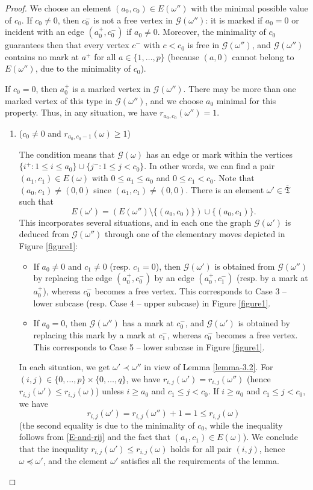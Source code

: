 \documentclass[11pt]{article}
\theoremstyle{definition}
\numberwithin{equation}{section}
\newcommand{\ppermutationsof}{\mathfrak{T}}
\newcommand{\parameters}{\overline{\ppermutationsof}}
\begin{document}
\begin{proof}
We choose an element $(a_0,c_0)\in E(\omega'') $ with the minimal possible value of $c_0$.
If $c_0\not=0$, then $c_0^-$ is not a free vertex in $\mathcal{G}(\omega'')$: it is marked if $a_0=0$ or incident with an edge $(a_0^+,c_0^-)$ if $a_0\not=0$. Moreover, the minimality of $c_0$ guarantees then that every vertex $c^-$ with $c<c_0$ is free in $\mathcal{G}(\omega'')$, and $\mathcal{G}(\omega'')$ contains no mark at $a^+$ for all $a\in\{1,\ldots,p\}$ (because $(a,0)$ cannot belong to $E(\omega'')$, due to the minimality of $c_0$).

If $c_0=0$, then $a_0^+$ is a marked vertex in $\mathcal{G}(\omega'')$.
There may be more than one marked vertex of this type in $\mathcal{G}(\omega'')$, and we choose $a_0$ minimal for this property. Thus, in any situation, we have $r_{a_0,c_0}(\omega'')=1$.

\begin{enumerate}[label=\textbf{Case \arabic*}]
\item ($c_0\not=0$ and $r_{a_0,c_0-1}(\omega)\geq 1$)

\noindent The condition means that $\mathcal{G}(\omega)$ has an edge or mark within the vertices $\{i^+:1\leq i\leq a_0\}\cup\{j^-:1\leq j<c_0\}$.
In other words, we can find a pair $(a_1,c_1)\in E(\omega)$
with $0\leq a_1\leq a_0$ and $0\leq c_1<c_0$.
Note that $(a_0,c_1)\not=(0,0)$ since $(a_1,c_1)\not=(0,0)$.
There is an element
$\omega'\in\parameters$ such that
\[
E(\omega')=(E(\omega'')\setminus\{(a_0,c_0)\})\cup\{(a_0,c_1)\}.
\]
This incorporates several situations, and in each one the graph $\mathcal{G}(\omega')$ is deduced from $\mathcal{G}(\omega'')$ through one of the elementary moves depicted in Figure \ref{figure1}:
\begin{itemize}
\item If $a_0\not=0$ and $c_1\not=0$ (resp. $c_1=0$), then $\mathcal{G}(\omega')$ is obtained from $\mathcal{G}(\omega'')$ by replacing
the edge $(a_0^+,c_0^-)$ by an edge $(a_0^+,c_1^-)$ (resp. by a mark
at $a_0^+$), whereas $c_0^-$ becomes a free vertex. This
corresponds to Case 3 -- lower subcase (resp. Case 4 -- upper
subcase) in Figure \ref{figure1}.
\item If $a_0=0$, then $\mathcal{G}(\omega'')$
has a mark at $c_0^-$, and $\mathcal{G}(\omega')$
is obtained by replacing this mark by a mark at $c_1^-$, whereas $c_0^-$ becomes a free vertex.
This corresponds to Case 5 -- lower subcase in Figure \ref{figure1}.
\end{itemize}
In each situation, we get $\omega'\prec\omega''$ in view of Lemma \ref{lemma-3.2}.
For $(i,j)\in\{0,\ldots,p\}\times\{0,\ldots,q\}$, we have
$r_{i,j}(\omega')=r_{i,j}(\omega'')$ (hence $r_{i,j}(\omega')\leq r_{i,j}(\omega)$) unless $i\geq a_0$ and $c_1\leq j<c_0$.
If $i\geq a_0$ and $c_1\leq j<c_0$, we have
\[r_{i,j}(\omega')=r_{i,j}(\omega'')+1=1\leq r_{i,j}(\omega)\]
(the second equality is due to the minimality of $c_0$, while the inequality follows from \eqref{E-and-rij} and the fact that $(a_1,c_1)\in E(\omega)$). We conclude that the inequality $r_{i,j}(\omega')\leq r_{i,j}(\omega)$ holds for all pair $(i,j)$, hence $\omega\preceq\omega'$, and the element $\omega'$ satisfies all the requirements of the lemma.




\end{enumerate}
\end{proof}
\end{document}
